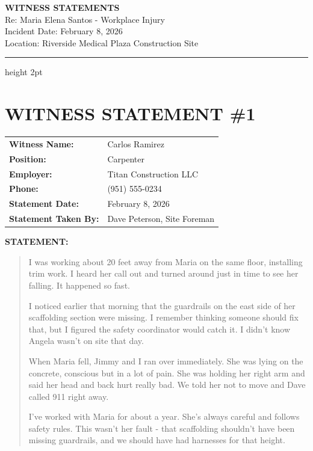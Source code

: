 \documentclass[11pt]{article}
\begin{document}
\begin{center}
{\LARGE\bfseries WITNESS STATEMENTS}\\[0.5em]
{\large Re: Maria Elena Santos - Workplace Injury}\\[0.3em]
{\normalsize Incident Date: February 8, 2026}\\
{\normalsize Location: Riverside Medical Plaza Construction Site}
\end{center}

\vspace{1em}
\hrule height 2pt
\vspace{2em}

\section*{WITNESS STATEMENT \#1}

\begin{tabular}{@{}p{4cm}p{10cm}@{}}
\textbf{Witness Name:} & Carlos Ramirez \\
\textbf{Position:} & Carpenter \\
\textbf{Employer:} & Titan Construction LLC \\
\textbf{Phone:} & (951) 555-0234 \\
\textbf{Statement Date:} & February 8, 2026 \\
\textbf{Statement Taken By:} & Dave Peterson, Site Foreman \\
\end{tabular}

\vspace{1em}

\noindent\textbf{STATEMENT:}

\begin{quote}
I was working about 20 feet away from Maria on the same floor, installing trim work. I heard her call out and turned around just in time to see her falling. It happened so fast.

I noticed earlier that morning that the guardrails on the east side of her scaffolding section were missing. I remember thinking someone should fix that, but I figured the safety coordinator would catch it. I didn't know Angela wasn't on site that day.

When Maria fell, Jimmy and I ran over immediately. She was lying on the concrete, conscious but in a lot of pain. She was holding her right arm and said her head and back hurt really bad. We told her not to move and Dave called 911 right away.

I've worked with Maria for about a year. She's always careful and follows safety rules. This wasn't her fault - that scaffolding shouldn't have been missing guardrails, and we should have had harnesses for that height.
\end{quote}
\end{document}
